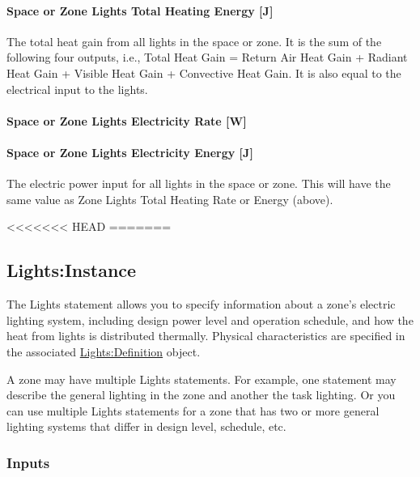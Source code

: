 \paragraph{Space or Zone Lights Total Heating Energy {[}J{]}}\label{zone-lights-total-heating-energy-j}

The total heat gain from all lights in the space or zone. It is the sum of the following four outputs, i.e., Total Heat Gain = Return Air Heat Gain + Radiant Heat Gain + Visible Heat Gain + Convective Heat Gain. It is also equal to the electrical input to the lights.

\paragraph{Space or Zone Lights Electricity Rate {[}W{]}}\label{zone-lights-electric-power-w}

\paragraph{Space or Zone Lights Electricity Energy {[}J{]}}\label{zone-lights-electric-energy-j}

The electric power input for all lights in the space or zone. This will have the same value as Zone Lights Total Heating Rate or Energy (above).

<<<<<<< HEAD
=======

\subsection{Lights:Instance}\label{lightsinstance}

The Lights statement allows you to specify information about a zone's electric lighting system, including design power level and operation schedule, and how the heat from lights is distributed thermally. Physical characteristics are specified in the associated \hyperref[lightsdefinition]{Lights:Definition} object.

A zone may have multiple Lights statements. For example, one statement may describe the general lighting in the zone and another the task lighting. Or you can use multiple Lights statements for a zone that has two or more general lighting systems that differ in design level, schedule, etc.

\subsubsection{Inputs}\label{inputs-2-021-lights-instance}

